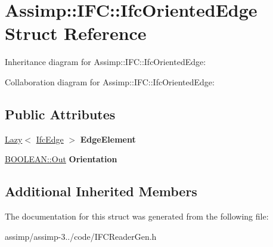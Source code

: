 \hypertarget{struct_assimp_1_1_i_f_c_1_1_ifc_oriented_edge}{\section{Assimp\+:\+:I\+F\+C\+:\+:Ifc\+Oriented\+Edge Struct Reference}
\label{struct_assimp_1_1_i_f_c_1_1_ifc_oriented_edge}
}


Inheritance diagram for Assimp\+:\+:I\+F\+C\+:\+:Ifc\+Oriented\+Edge\+:


Collaboration diagram for Assimp\+:\+:I\+F\+C\+:\+:Ifc\+Oriented\+Edge\+:
\subsection*{Public Attributes}
\begin{DoxyCompactItemize}
\item 
\hypertarget{struct_assimp_1_1_i_f_c_1_1_ifc_oriented_edge_a706427c0dcad9238a940658ca6ba69e2}{\hyperlink{struct_assimp_1_1_s_t_e_p_1_1_lazy}{Lazy}$<$ \hyperlink{struct_assimp_1_1_i_f_c_1_1_ifc_edge}{Ifc\+Edge} $>$ {\bfseries Edge\+Element}}\label{struct_assimp_1_1_i_f_c_1_1_ifc_oriented_edge_a706427c0dcad9238a940658ca6ba69e2}

\item 
\hypertarget{struct_assimp_1_1_i_f_c_1_1_ifc_oriented_edge_aa555da3dfc38d3f1264a5718384ef505}{\hyperlink{classboost_1_1shared__ptr}{B\+O\+O\+L\+E\+A\+N\+::\+Out} {\bfseries Orientation}}\label{struct_assimp_1_1_i_f_c_1_1_ifc_oriented_edge_aa555da3dfc38d3f1264a5718384ef505}

\end{DoxyCompactItemize}
\subsection*{Additional Inherited Members}


The documentation for this struct was generated from the following file\+:\begin{DoxyCompactItemize}
\item 
assimp/assimp-\/3../code/I\+F\+C\+Reader\+Gen.\+h\end{DoxyCompactItemize}
